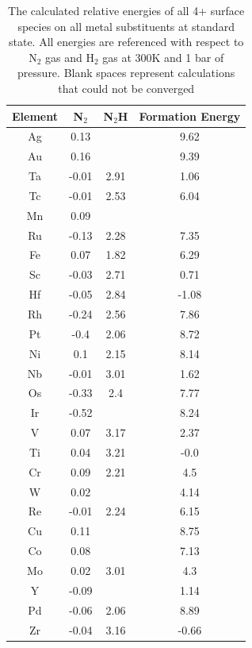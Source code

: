 \documentclass{article}
\begin{document}
\begin{table}
\begin{center}
\begin{tabular}{| c | c | c | c |}
\hline
Element & N$_2$ & N$_2$H & Formation Energy \\
\hline
Ag & 0.13 &  & 9.62 \\
Au & 0.16 &  & 9.39 \\
Ta & -0.01 & 2.91 & 1.06 \\
Tc & -0.01 & 2.53 & 6.04 \\
Mn & 0.09 &  &  \\
Ru & -0.13 & 2.28 & 7.35 \\
Fe & 0.07 & 1.82 & 6.29 \\
Sc & -0.03 & 2.71 & 0.71 \\
Hf & -0.05 & 2.84 & -1.08 \\
Rh & -0.24 & 2.56 & 7.86 \\
Pt & -0.4 & 2.06 & 8.72 \\
Ni & 0.1 & 2.15 & 8.14 \\
Nb & -0.01 & 3.01 & 1.62 \\
Os & -0.33 & 2.4 & 7.77 \\
Ir & -0.52 &  & 8.24 \\
V & 0.07 & 3.17 & 2.37 \\
Ti & 0.04 & 3.21 & -0.0 \\
Cr & 0.09 & 2.21 & 4.5 \\
W & 0.02 &  & 4.14 \\
Re & -0.01 & 2.24 & 6.15 \\
Cu & 0.11 &  & 8.75 \\
Co & 0.08 &  & 7.13 \\
Mo & 0.02 & 3.01 & 4.3 \\
Y & -0.09 &  & 1.14 \\
Pd & -0.06 & 2.06 & 8.89 \\
Zr & -0.04 & 3.16 & -0.66 \\
\hline
\end{tabular}
\end{center}
\label{table:4+_energies}
\caption{The calculated relative energies of all 4+ surface species on all metal substituents at standard state. All energies are referenced with respect to N$_2$ gas and H$_2$ gas at 300K and 1 bar of pressure. Blank spaces represent calculations that could not be converged}
\end{table}
\end{document}
